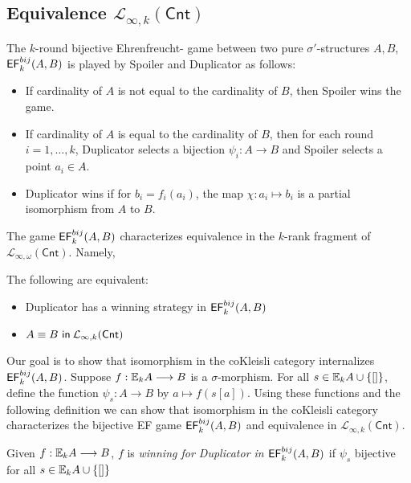 \subsection{Equivalence $\mathcal{L}_{\infty,k}(\mathsf{Cnt})$} 
The $k$-round bijective Ehrenfreucht-{\Fraisse} game between two pure $\sigma'$-structures $A,B$, ${\mathsf{EF}^{bij}_{k}(A,B)}$ is played by Spoiler and Duplicator as follows:
\begin{itemize}
\item If cardinality of $A$ is not equal to the cardinality of $B$, then Spoiler wins the game.
\item If cardinality of $A$ is equal to the cardinality of $B$, then for each round $i = 1,\dots,k$, Duplicator selects a bijection $\psi_{i}:A \longrightarrow B$ and Spoiler selects a point $a_{i} \in A$. 
\item Duplicator wins if for $b_{i} = f_{i}(a_{i})$, the map $\chi:a_{i} \mapsto b_{i}$ is a partial isomorphism from $A$ to $B$. 
\end{itemize}
The game ${\mathsf{EF}^{bij}_{k}(A,B)}$ characterizes equivalence in the $k$-rank fragment of $\mathcal{L}_{\infty,\omega}(\mathsf{Cnt})$. Namely,
\begin{prop}
The following are equivalent: 
\begin{itemize}
\item Duplicator has a winning strategy in ${\mathsf{EF}^{bij}_{k}(A,B)}$ 
\item ${A \equiv B \ \mathsf{in}\: \mathcal{L}_{\infty,k}(\mathsf{Cnt})}$ 
\end{itemize}
\label{prop:bijToSyntaxEF}
\end{prop}
Our goal is to show that isomorphism in the coKleisli category internalizes ${\mathsf{EF}^{bij}_{k}(A,B)}$. Suppose $f:{\mathbb{E}_{k}A} \longrightarrow B$ is a $\sigma$-morphism. For all $s \in {\mathbb{E}_{k}A} \cup \{[]\}$, define the function $\psi_{s}:A \longrightarrow B$ by $a \mapsto f(s[a])$. Using these functions and the following definition we can show that isomorphism in the coKleisli category characterizes the bijective EF game ${\mathsf{EF}^{bij}_{k}(A,B)}$ and equivalence in $\mathcal{L}_{\infty,k}(\mathsf{Cnt})$.
\begin{defn}
Given $f:{\mathbb{E}_{k}A} \longrightarrow B$, $f$ is \textit{winning for Duplicator in ${\mathsf{EF}^{bij}_{k}(A,B)}$} if $\psi_{s}$ bijective for all $s \in {\mathbb{E}_{k}A} \cup \{[]\}$ 
\end{defn}

